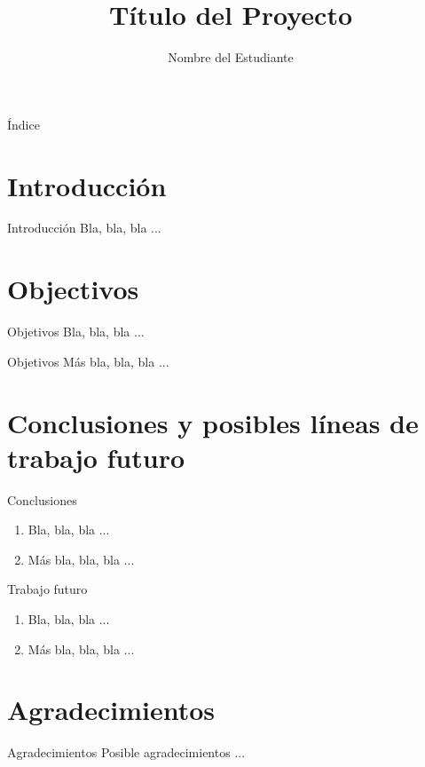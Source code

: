 \documentclass[aspectratio=1610]{beamer}
\title{Título del Proyecto}
\author{Nombre del Estudiante}
\institute{Trabajo Fin de Máster\\Departamento de Informática\\Universidad de Almería}
\begin{document}
 
\begin{frame}
  \titlepage
\end{frame}

\begin{frame}{Índice}
  \tableofcontents
\end{frame}

\section{Introducción}

\begin{frame}{Introducción}
  Bla, bla, bla ...
\end{frame}

\section{Objectivos}

\begin{frame}{Objetivos}
  Bla, bla, bla ...
\end{frame}

\begin{frame}{Objetivos}
  Más bla, bla, bla ...
\end{frame}

\section{Conclusiones y posibles líneas de trabajo futuro}

\begin{frame}{Conclusiones}
  \begin{enumerate}
  \item Bla, bla, bla ...
  \item Más bla, bla, bla ...
  \end{enumerate}
\end{frame}

\begin{frame}{Trabajo futuro}
  \begin{enumerate}
  \item Bla, bla, bla ...
  \item Más bla, bla, bla ...
  \end{enumerate}
\end{frame}

\section{Agradecimientos}

\begin{frame}{Agradecimientos}
  Posible agradecimientos ...
\end{frame}
\end{document}
